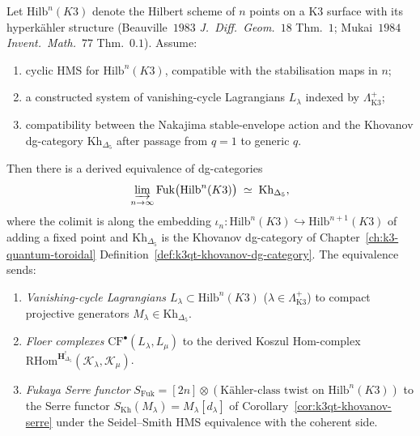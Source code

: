 \begin{conjecture}
\label{thm:fuk-khovanov-hilb-k3}
\ClaimStatusConjectured
Let $\mathrm{Hilb}^n(K3)$ denote the Hilbert scheme of $n$ points on
a K3 surface with its hyperk\"ahler structure (Beauville~$1983$
\emph{J.\ Diff.\ Geom.}~$18$ Thm.\ $1$; Mukai~$1984$ \emph{Invent.\
Math.}~$77$ Thm.\ $0.1$). Assume:
\begin{enumerate}[label=\textup{(\alph*)}]
\item cyclic HMS for $\mathrm{Hilb}^n(K3)$, compatible with the
stabilisation maps in $n$;
\item a constructed system of vanishing-cycle Lagrangians
$L_\lambda$ indexed by $\Lambda_{\mathrm{K3}}^+$;
\item compatibility between the Nakajima stable-envelope action and
the Khovanov dg-category $\mathrm{Kh}_{\Delta_5}$ after passage from
$q=1$ to generic $q$.
\end{enumerate}
Then there is a derived equivalence of
dg-categories
\[
 \varinjlim_{n\to\infty}
 \mathrm{Fuk}\bigl(\mathrm{Hilb}^n(K3)\bigr)
 \;\simeq\;
 \mathrm{Kh}_{\Delta_5},
\]
where the colimit is along the embedding
$\iota_n \colon \mathrm{Hilb}^n(K3)\hookrightarrow
\mathrm{Hilb}^{n+1}(K3)$ of adding a fixed point and
$\mathrm{Kh}_{\Delta_5}$ is the Khovanov dg-category of
Chapter~\ref{ch:k3-quantum-toroidal}
Definition~\ref{def:k3qt-khovanov-dg-category}.
The equivalence sends:
\begin{enumerate}[label=\textup{(\roman*)}]
\item \emph{Vanishing-cycle Lagrangians $L_\lambda\subset
\mathrm{Hilb}^n(K3)$} ($\lambda\in\Lambda_{\mathrm{K3}}^+$) to
compact projective generators $M_\lambda\in\mathrm{Kh}_{\Delta_5}$.
\item \emph{Floer complexes} $\mathrm{CF}^\bullet(L_\lambda, L_\mu)$ to
the derived Koszul $\mathrm{Hom}$-complex
$\mathrm{RHom}^{\mathbf H_{\Delta_5}^!}(\mathcal K_\lambda,
\mathcal K_\mu)$.
\item \emph{Fukaya Serre functor} $S_{\mathrm{Fuk}} = [2n] \otimes
(\text{K\"ahler-class twist on }\mathrm{Hilb}^n(K3))$ to the Serre
functor $S_{\mathrm{Kh}}(M_\lambda) = M_\lambda[d_\lambda]$ of
Corollary~\ref{cor:k3qt-khovanov-serre} under the Seidel--Smith
HMS equivalence with the coherent side.
\end{enumerate}
\end{conjecture}

